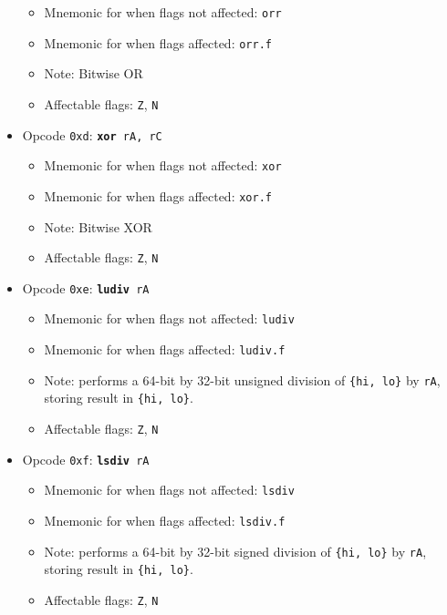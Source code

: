 \documentclass{article}
\begin{document}
\begin{itemize}
\begin{itemize}
			\item Mnemonic for when flags not affected:  \texttt{orr}
			\item Mnemonic for when flags affected:  \texttt{orr.f}
			\item Note:  Bitwise OR
			\item Affectable flags:
				\texttt{Z}, \texttt{N}
		\end{itemize}
		\item Opcode \texttt{0xd}:
			\texttt{\textbf{xor} rA, rC}
		\begin{itemize}
			\item Mnemonic for when flags not affected:  \texttt{xor}
			\item Mnemonic for when flags affected:  \texttt{xor.f}
			\item Note:  Bitwise XOR
			\item Affectable flags:
				\texttt{Z}, \texttt{N}
		\end{itemize}
		\item Opcode \texttt{0xe}:
			\texttt{\textbf{ludiv} rA}
		\begin{itemize}
			\item Mnemonic for when flags not affected:  \texttt{ludiv}
			\item Mnemonic for when flags affected:  \texttt{ludiv.f}
			\item Note:  performs a 64-bit by 32-bit unsigned division of
			\texttt{\{hi, lo\}} by \texttt{rA}, storing result in
			\texttt{\{hi, lo\}}.
			\item Affectable flags:
				\texttt{Z}, \texttt{N}
		\end{itemize}
		\item Opcode \texttt{0xf}:
			\texttt{\textbf{lsdiv} rA}
		\begin{itemize}
			\item Mnemonic for when flags not affected:  \texttt{lsdiv}
			\item Mnemonic for when flags affected:  \texttt{lsdiv.f}
			\item Note:  performs a 64-bit by 32-bit signed division of
			\texttt{\{hi, lo\}} by \texttt{rA}, storing result in
			\texttt{\{hi, lo\}}.
			\item Affectable flags:
				\texttt{Z}, \texttt{N}
		\end{itemize}
	\end{itemize}
\end{document}
